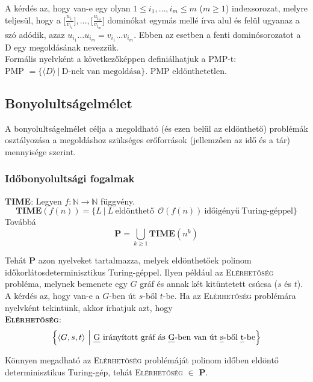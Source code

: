 \documentclass[tikz,12pt,margin=0px]{article}
\newcommand\ddfrac[2]{\frac{\displaystyle #1}{\displaystyle #2}}
\begin{document}
    \noindent A kérdés az, hogy van-e egy olyan	$1 \leq i_{1}, \ldots, i_{m} \leq m$ ($m \geq 1$) indexsorozat, melyre teljesül, hogy a $\Big[\ddfrac{u_{i_{1}}}{v_{i_{1}}}\Big], \ldots, \Big[\ddfrac{u_{i_{m}}}{v_{i_{m}}}\Big]$ dominókat egymás mellé írva alul és felül ugyanaz a szó adódik, azaz $u_{i_{1}} \ldots u_{i_{m}} = v_{i_{1}} \ldots v_{i_{m}}$. Ebben az esetben a fenti dominósorozatot a D egy megoldásának nevezzük.\\
	
	\noindent Formális nyelvként a következőképpen definiálhatjuk a PMP-t:\\
	PMP $= \Big\{ \langle D \rangle \ |\ \text{D-nek van megoldása} \Big\}$. PMP eldönthetetlen.
		
	\subsection*{Bonyolultságelmélet}
	
	A bonyolultságelmélet célja a megoldható (és ezen belül az eldönthető) problémák osztályozása a megoldáshoz szükséges
	erőforrások (jellemzően az idő és a tár) mennyisége szerint.
	
	\subsubsection*{Időbonyolultsági fogalmak}
	
    \noindent \textbf{TIME}: Legyen $f : \mathbb{N} \to \mathbb{N}$ függvény.
    \[
        \textbf{TIME}(f(n)) = \Big\{L \ \Big| \ L \ \text{eldönthető}\ \ \mathcal{O}(f(n)) \ \text{időigényű} \ \text{Turing-géppel} \Big\}
    \]
    Továbbá	
    \[
    \textbf{P} =\bigcup\limits_{k \geq 1} \textbf{TIME}(n^{k})
    \]

    \noindent Tehát \textbf{P} azon nyelveket tartalmazza, melyek eldönthetőek polinom időkorlátosdeterminisztikus Turing-géppel. Ilyen például az \textsc{Elérhetőség} probléma, melynek bemenete egy $G$ gráf és annak két kitüntetett csúcsa ($s$ és $t$). A kérdés az, hogy van-e a $G$-ben út $s$-ből $t$-be. Ha az \textsc{Elérhetőség} problémára nyelvként tekintünk, akkor írhatjuk azt, hogy\\
	
	\noindent \textsc{\textbf{Elérhetőség}}:
    \[
        \Big\{\langle G, s, t \rangle \ \Big| \ \text{\emph{G} irányított gráf ás \emph{G}-ben van út \emph{s}-ből \emph{t}-be} \Big\}
    \]
	
	\noindent Könnyen megadható az \textsc{Elérhetőség} problémáját polinom időben eldöntő determinisztikus Turing-gép, tehát \textsc{Elérhetőség} $\in$ \textbf{P}.\\
\end{document}

